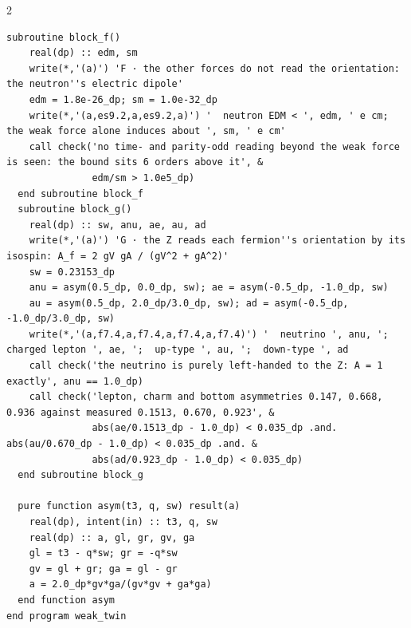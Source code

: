 \documentclass[10pt]{article}
\begin{document}
\begin{multicols}{2}
\begin{Verbatim}[fontsize=\fontsize{6.2}{7.2}\selectfont,breaklines,breakanywhere,breaksymbolleft={}]
  subroutine block_f()
    real(dp) :: edm, sm
    write(*,'(a)') 'F · the other forces do not read the orientation: the neutron''s electric dipole'
    edm = 1.8e-26_dp; sm = 1.0e-32_dp
    write(*,'(a,es9.2,a,es9.2,a)') '  neutron EDM < ', edm, ' e cm; the weak force alone induces about ', sm, ' e cm'
    call check('no time- and parity-odd reading beyond the weak force is seen: the bound sits 6 orders above it', &
               edm/sm > 1.0e5_dp)
  end subroutine block_f
  subroutine block_g()
    real(dp) :: sw, anu, ae, au, ad
    write(*,'(a)') 'G · the Z reads each fermion''s orientation by its isospin: A_f = 2 gV gA / (gV^2 + gA^2)'
    sw = 0.23153_dp
    anu = asym(0.5_dp, 0.0_dp, sw); ae = asym(-0.5_dp, -1.0_dp, sw)
    au = asym(0.5_dp, 2.0_dp/3.0_dp, sw); ad = asym(-0.5_dp, -1.0_dp/3.0_dp, sw)
    write(*,'(a,f7.4,a,f7.4,a,f7.4,a,f7.4)') '  neutrino ', anu, ';  charged lepton ', ae, ';  up-type ', au, ';  down-type ', ad
    call check('the neutrino is purely left-handed to the Z: A = 1 exactly', anu == 1.0_dp)
    call check('lepton, charm and bottom asymmetries 0.147, 0.668, 0.936 against measured 0.1513, 0.670, 0.923', &
               abs(ae/0.1513_dp - 1.0_dp) < 0.035_dp .and. abs(au/0.670_dp - 1.0_dp) < 0.035_dp .and. &
               abs(ad/0.923_dp - 1.0_dp) < 0.035_dp)
  end subroutine block_g

  pure function asym(t3, q, sw) result(a)
    real(dp), intent(in) :: t3, q, sw
    real(dp) :: a, gl, gr, gv, ga
    gl = t3 - q*sw; gr = -q*sw
    gv = gl + gr; ga = gl - gr
    a = 2.0_dp*gv*ga/(gv*gv + ga*ga)
  end function asym
end program weak_twin
\end{Verbatim}
\end{multicols}
\end{document}
